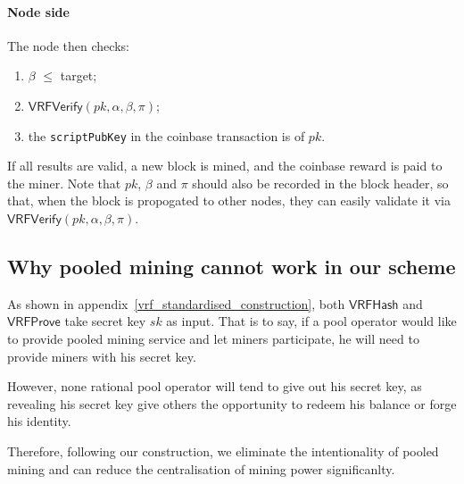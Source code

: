 \paragraph{Node side}
\newblock
\newline
The node then checks:
\begin{enumerate}
    \item $\beta$ $\le$ target;
    \item $\mathsf{VRFVerify}(pk, \alpha, \beta, \pi)$;
    \item the \texttt{scriptPubKey} in the coinbase transaction is of $pk$.
\end{enumerate}
If all results are valid, a new block is mined, and the coinbase reward is paid to the miner. Note that $pk$, $\beta$ and $\pi$ should also be recorded in the block header, so that, when the block is propogated to other nodes, they can easily validate it via $\mathsf{VRFVerify}(pk, \alpha, \beta, \pi)$.



\subsection{Why pooled mining cannot work in our scheme}
\label{sec:discourage-pool}

As shown in appendix~\ref{vrf_standardised_construction}, both $\mathsf{VRFHash}$ and $\mathsf{VRFProve}$ take secret key $sk$ as input.
That is to say, if a pool operator would like to provide pooled mining service and let miners participate, he will need to provide miners with his secret key.

However, none rational pool operator will tend to give out his secret key, as revealing his secret key give others the opportunity to redeem his balance or forge his identity.

Therefore, following our construction, we eliminate the intentionality of pooled mining and can reduce the centralisation of mining power significanlty.
